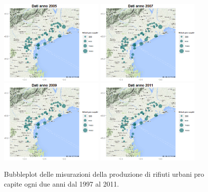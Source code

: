 \documentclass[a4paper,11pt,twoside,openright]{book}							%
\begin{document}
\begin{figure}[H]
	\includegraphics[trim=0cm 0cm 0cm 0cm,clip=true,width=0.45\textwidth]{Immagini/venezia_dati/Dati2005.png}
	\includegraphics[trim=0cm 0cm 0cm 0cm,clip=true,width=0.45\textwidth]{Immagini/venezia_dati/Dati2007.png}
	\includegraphics[trim=0cm 0cm 0cm 0cm,clip=true,width=0.45\textwidth]{Immagini/venezia_dati/Dati2009.png}
	\includegraphics[trim=0cm 0cm 0cm 0cm,clip=true,width=0.45\textwidth]{Immagini/venezia_dati/Dati2011.png}
	\caption{Bubbleplot delle misurazioni della produzione di rifiuti urbani pro capite ogni due anni dal 1997 al 2011.}
	\label{fig:Ven_bubbledati}
\end{figure}
\end{document}
